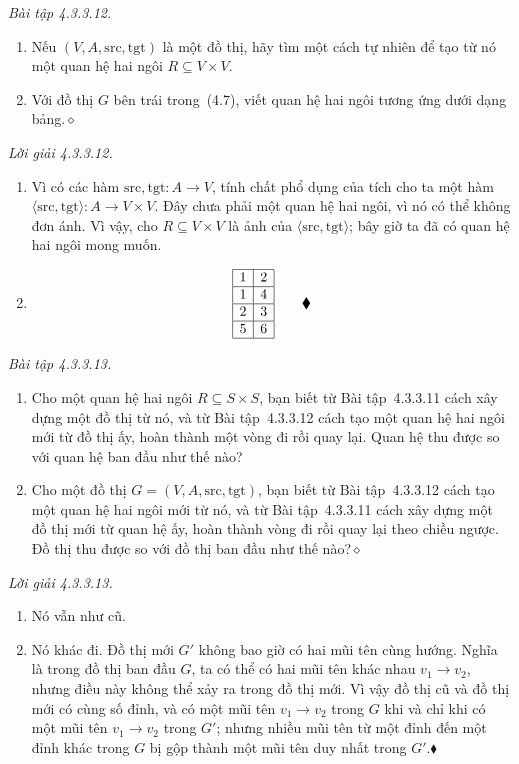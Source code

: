 \noindent\textit{Bài tập 4.3.3.12.}\keepwithnext
\begin{enumerate}[label=\alph*.]
\item Nếu $(V,A,\mathrm{src},\mathrm{tgt})$ là một đồ thị, hãy tìm một cách tự nhiên để tạo từ nó một quan hệ hai ngôi $R\subseteq V\times V$.
\item Với đồ thị $G$ bên trái trong~(4.7), viết quan hệ hai ngôi tương ứng dưới dạng bảng.\nobreak\hfill$\diamond$
\end{enumerate}

\noindent\textit{Lời giải 4.3.3.12.}\keepwithnext
\begin{enumerate}[label=\alph*.]
\item Vì có các hàm $\mathrm{src},\mathrm{tgt}:A\to V$, tính chất phổ dụng của tích cho ta một hàm $\langle\mathrm{src},\mathrm{tgt}\rangle:A\to V\times V$. Đây chưa phải một quan hệ hai ngôi, vì nó có thể không đơn ánh. Vì vậy, cho $R\subseteq V\times V$ là ảnh của $\langle\mathrm{src},\mathrm{tgt}\rangle$; bây giờ ta đã có quan hệ hai ngôi mong muốn.
\item
\[
\begin{array}{|r|r|}\hline1&2\\\hline1&4\\\hline2&3\\\hline5&6\\\hline\end{array}
\tag*{$\blacklozenge$}
\]
\end{enumerate}

\noindent\textit{Bài tập 4.3.3.13.}\keepwithnext
\begin{enumerate}[label=\alph*.]
\item Cho một quan hệ hai ngôi $R\subseteq S\times S$, bạn biết từ Bài tập~4.3.3.11 cách xây dựng một đồ thị từ nó, và từ Bài tập~4.3.3.12 cách tạo một quan hệ hai ngôi mới từ đồ thị ấy, hoàn thành một vòng đi rồi quay lại. Quan hệ thu được so với quan hệ ban đầu như thế nào?
\item Cho một đồ thị $G=(V,A,\mathrm{src},\mathrm{tgt})$, bạn biết từ Bài tập~4.3.3.12 cách tạo một quan hệ hai ngôi mới từ nó, và từ Bài tập~4.3.3.11 cách xây dựng một đồ thị mới từ quan hệ ấy, hoàn thành vòng đi rồi quay lại theo chiều ngược. Đồ thị thu được so với đồ thị ban đầu như thế nào?\nobreak\hfill$\diamond$
\end{enumerate}

\noindent\textit{Lời giải 4.3.3.13.}\keepwithnext
\begin{enumerate}[label=\alph*.]
\item Nó vẫn như cũ.
\item Nó khác đi. Đồ thị mới $G'$ không bao giờ có hai mũi tên cùng hướng. Nghĩa là trong đồ thị ban đầu $G$, ta có thể có hai mũi tên khác nhau $v_1\to v_2$, nhưng điều này không thể xảy ra trong đồ thị mới. Vì vậy đồ thị cũ và đồ thị mới có cùng số đỉnh, và có một mũi tên $v_1\to v_2$ trong $G$ khi và chỉ khi có một mũi tên $v_1\to v_2$ trong $G'$; nhưng nhiều mũi tên từ một đỉnh đến một đỉnh khác trong $G$ bị gộp thành một mũi tên duy nhất trong $G'$.\nobreak\hfill$\blacklozenge$
\end{enumerate}

